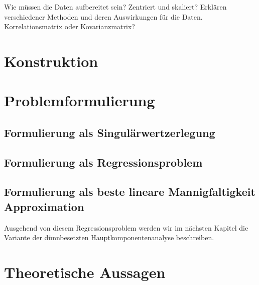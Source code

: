 Wie müssen die Daten aufbereitet sein? Zentriert und skaliert? Erklären verschiedener Methoden und deren Auswirkungen für die Daten. Korrelationsmatrix oder Kovarianzmatrix?




\section{Konstruktion}

\section{Problemformulierung}
\subsection{Formulierung als Singulärwertzerlegung}
\subsection{Formulierung als Regressionsproblem}
\subsection{Formulierung als beste lineare Mannigfaltigkeit Approximation}
Ausgehend von diesem Regressionsproblem werden wir im nächsten Kapitel die Variante der dünnbesetzten Hauptkomponentenanalyse beschreiben.

\section{Theoretische Aussagen}